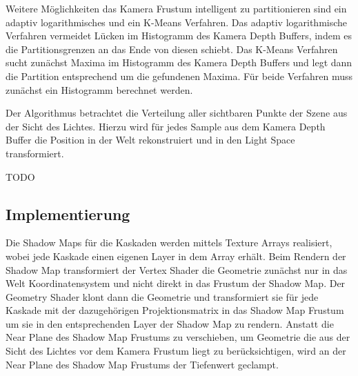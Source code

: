 \documentclass[runningheaders,a4paper]{llncs}
\begin{document}
Weitere Möglichkeiten das Kamera Frustum intelligent zu partitionieren sind ein adaptiv logarithmisches und ein K-Means Verfahren.
Das adaptiv logarithmische Verfahren vermeidet Lücken im Histogramm des Kamera Depth Buffers, indem es die Partitionsgrenzen an das Ende von diesen schiebt.
Das K-Means Verfahren sucht zunächst Maxima im Histogramm des Kamera Depth Buffers und legt dann die Partition entsprechend um die gefundenen Maxima.
Für beide Verfahren muss zunächst ein Histogramm berechnet werden.


Der Algorithmus betrachtet die Verteilung aller sichtbaren Punkte der Szene aus der Sicht des Lichtes.
Hierzu wird für jedes Sample aus dem Kamera Depth Buffer die Position in der Welt rekonstruiert und in den Light Space transformiert.



TODO



\subsection{Implementierung}

Die Shadow Maps für die Kaskaden werden mittels Texture Arrays realisiert, wobei jede Kaskade einen eigenen Layer in dem Array erhält.
Beim Rendern der Shadow Map transformiert der Vertex Shader die Geometrie zunächst nur in das Welt Koordinatensystem und nicht direkt in das Frustum der Shadow Map.
Der Geometry Shader klont dann die Geometrie und transformiert sie für jede Kaskade mit der dazugehörigen Projektionsmatrix in das Shadow Map Frustum um sie in den entsprechenden Layer der Shadow Map zu rendern.
Anstatt die Near Plane des Shadow Map Frustums zu verschieben, um Geometrie die aus der Sicht des Lichtes vor dem Kamera Frustum liegt zu berücksichtigen, wird an der Near Plane des Shadow Map Frustums der Tiefenwert geclampt.






\end{document}
